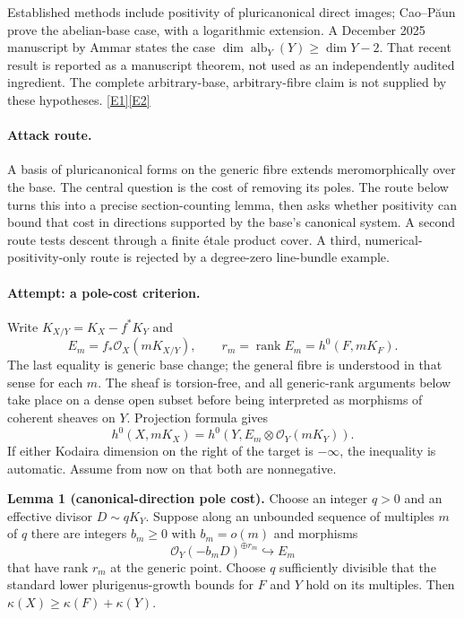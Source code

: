 \documentclass[11pt,a4paper]{article}
\newcommand{\eref}[2]{\hyperlink{extra:#1:#2}{[E#2]}}
\numberwithin{equation}{section}
\begin{document}
Established methods include positivity of pluricanonical direct images;
Cao--P\u{a}un prove the abelian-base case, with a logarithmic extension.
A December 2025 manuscript by Ammar states the case
$\dim\operatorname{alb}_Y(Y)\geq\dim Y-2$. That recent result is reported
as a manuscript theorem, not used as an independently audited ingredient.
The complete arbitrary-base, arbitrary-fibre claim is not supplied by
these hypotheses. \eref{statement}{1}\eref{statement}{2}

\paragraph{Attack route.}
A basis of pluricanonical forms on the generic fibre extends meromorphically
over the base. The central question is the cost of removing its poles.
The route below turns this into a precise section-counting lemma, then
asks whether positivity can bound that cost in directions supported by
the base's canonical system. A second route tests descent through a
finite \'etale product cover. A third, numerical-positivity-only route is
rejected by a degree-zero line-bundle example.

\paragraph{Attempt: a pole-cost criterion.}
Write $K_{X/Y}=K_X-f^*K_Y$ and
\[
 E_m=f_*\mathcal O_X(mK_{X/Y}),\qquad
 r_m=\operatorname{rank}E_m=h^0(F,mK_F).
\]
The last equality is generic base change; the general fibre is understood
in that sense for each $m$. The sheaf is torsion-free, and all generic-rank
arguments below take place on a dense open subset before being interpreted
as morphisms of coherent sheaves on $Y$. Projection formula gives
\begin{equation}\label{eq:statement:projection}
 h^0(X,mK_X)=h^0(Y,E_m\otimes\mathcal O_Y(mK_Y)).
\end{equation}
If either Kodaira dimension on the right of the target is $-\infty$, the
inequality is automatic. Assume from now on that both are nonnegative.

\textbf{Lemma 1 (canonical-direction pole cost).}
Choose an integer $q>0$ and an effective divisor $D\sim qK_Y$.
Suppose along an unbounded sequence of multiples $m$ of $q$ there are
integers $b_m\geq0$ with $b_m=o(m)$ and morphisms
\begin{equation}\label{eq:statement:injection}
 \mathcal O_Y(-b_mD)^{\oplus r_m}\hookrightarrow E_m
\end{equation}
that have rank $r_m$ at the generic point. Choose $q$ sufficiently divisible
that the standard lower plurigenus-growth bounds for $F$ and $Y$ hold on
its multiples. Then $\kappa(X)\geq\kappa(F)+\kappa(Y)$.
\end{document}
